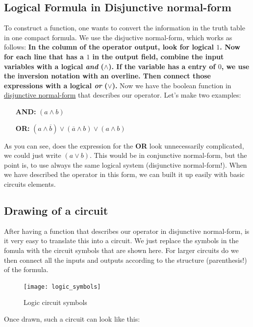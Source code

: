 \subsection{Logical Formula in Disjunctive normal-form}
To construct a function, one wants to convert the information in the truth table in one compact formula. We use the disjuctive normal-form, which works as follows: 
\newline \textbf{In the column of the operator output, look for logical $1$. Now for each line that has a $1$ in the output field, combine the input variables with a logical \textit{and} ($\land$). If the variable has a entry of $0$, we use the inversion notation with an overline. Then connect those expressions with a logical \textit{or} ($\lor$).} 
\newline Now we have the boolean function in \underline{disjunctive normal-form} that describes our operator. Let's make two examples: \newline
\begin{enumerate}
 \item [\textbf{AND:}]$(a\land b)$
 \item [\textbf{OR:}]$(a\land \overline{b})\lor(\overline{a}\land b)\lor(a\land b)$
\end{enumerate}

As you can see, does the expression for the \textbf{OR} look unnecessarily complicated, we could just write $(a\lor b)$. This would be in conjunctive normal-form, but the point is, to use always the same logical system (disjunctive normal-form!). When we have described the operator in this form, we can built it up easily with basic circuits elements.  

\subsection{Drawing of a circuit}
After having a function that describes our operator in disjunctive normal-form, is it very easy to translate this into a circuit. We just replace the symbols in the fomula with the circuit symbols that are shown here. For larger circuits do we then connect all the inputs and outputs according to the structure (parenthesis!) of the formula.

\begin{figure}[H]
\centering
  \texttt{[image: logic\_symbols]}%
  \caption{Logic circuit symbols}%
  \label{fig:logic_symbols}
\end{figure}
Once drawn, such a circuit can look like this:

